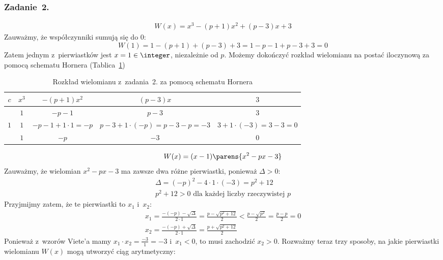 \subsubsection*{Zadanie~2.}
\begin{gather*}
    W(x) = x^3 - (p + 1)x^2 + (p - 3)x + 3
\end{gather*}
Zauważmy, że współczynniki sumują się do \(0\):
\begin{equation*}
    W(1) = 1 - (p + 1) + (p - 3) + 3 = 1 - p - 1 + p - 3 + 3 = 0
\end{equation*}
Zatem jednym z~pierwiastków jest \(x = 1 \in \integer\), niezależnie od \(p\). Możemy dokończyć rozkład wielomianu na postać iloczynową za pomocą schematu Hornera (Tablica~\ref{2020_09_28:2:table:horner})
\begin{table}[H]
    \centering
    \begin{tabular}{c|c|c|c|c}
        \(c\) & \(x^3\) & \(-(p + 1)x^2\) & \((p - 3)x\) & \(3\)\\
        \hline
        & \(1\) & \(-p - 1\) & \(p - 3\) & \(3\)\\
        \hline
        \(1\) & \(1\) & \(-p - 1 + 1 \cdot 1 = -p\) & \(p - 3 + 1 \cdot (-p) = p - 3 - p = -3\) & \(3 + 1 \cdot (-3) = 3 - 3 = 0\)\\
        \hline
        & \(1\) & \(-p\) & \(-3\) & \(0\)
    \end{tabular}
    \caption{Rozkład wielomianu z~zadania~2. za pomocą schematu Hornera}
    \label{2020_09_28:2:table:horner}
\end{table}
\begin{equation*}
    W(x) = (x - 1)\parens{x^2 - px - 3}
\end{equation*}
Zauważmy, że wielomian \(x^2 - px - 3\) ma zawsze dwa różne pierwiastki, ponieważ \(\Delta > 0\):
\begin{gather*}
    \Delta = (-p)^2 - 4 \cdot 1 \cdot (-3) = p^2 + 12\\
    p^2 + 12 > 0 \text{ dla każdej liczby rzeczywistej \(p\)}
\end{gather*}
Przyjmijmy zatem, że te pierwiastki to \(x_1\) i~\(x_2\):
\begin{gather*}
    x_1 = \frac{-(-p) - \sqrt{\Delta}}{2 \cdot 1} = \frac{p - \sqrt{p^2 + 12}}{2} < \frac{p - \sqrt{p^2}}{2} = \frac{p - p}{2} = 0\\
    x_2 = \frac{-(-p) + \sqrt{\Delta}}{2 \cdot 1} = \frac{p + \sqrt{p^2 + 12}}{2}
\end{gather*}
Ponieważ z~wzorów Viete'a mamy \(x_1 \cdot x_2 = \frac{-3}{1} = -3\) i~\(x_1 < 0\), to musi zachodzić \(x_2 > 0\). Rozważmy teraz trzy sposoby, na jakie pierwiastki wielomianu \(W(x)\) mogą utworzyć ciąg arytmetyczny:
